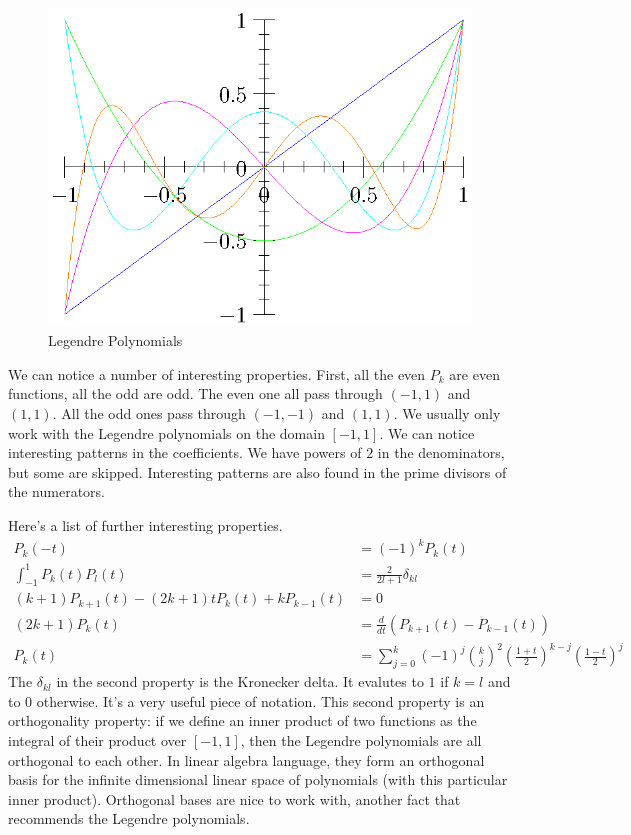 \documentclass[fleqn,letterpaper]{report}
\begin{document}
\begin{figure}[t]
\centering
\includegraphics[width=12cm]{figure20.eps}
\caption{Legendre Polynomials}
\label{figure-legendre-polynomials}
\end{figure}

We can notice a number of interesting properties. First, all
the even $P_k$ are even functions, all the odd are odd. The
even one all pass through $(-1,1)$ and $(1,1)$. All the odd
ones pass through $(-1,-1)$ and $(1,1)$. We usually only work
with the Legendre polynomials on the domain $[-1,1]$. We can
notice interesting patterns in the coefficients. We have
powers of $2$ in the denominators, but some are skipped. 
Interesting patterns are also found in the prime divisors of
the numerators.

Here's a list of further interesting properties.
\begin{align*}
P_k(-t) & = (-1)^k P_k(t) \\
\int_{-1}^1 P_k(t) P_l(t) & = \frac{2}{2l+1} \delta_{kl} \\
(k+1)P_{k+1}(t) - (2k+1)tP_k(t) + k P_{k-1}(t) & = 0 \\
(2k+1) P_k(t) & = \frac{d}{dt} \left( P_{k+1}(t) - P_{k-1}(t)
\right) \\
P_k(t) & = \sum_{j=0}^k (-1)^j \binom{k}{j}^2 \left(
\frac{1+t}{2} \right)^{k-j} \left( \frac{1-t}{2} \right)^j
\end{align*}
The $\delta_{kl}$ in the second property is the Kronecker
delta. It evalutes to $1$ if $k=l$ and to $0$ otherwise.
It's a very useful piece of notation. This second property is
an orthogonality property: if we define an inner product of
two functions as the integral of their product over $[-1,1]$,
then the Legendre polynomials are all orthogonal to each
other. In linear algebra language, they form an orthogonal
basis for the infinite dimensional linear space of polynomials
(with this particular inner product). Orthogonal bases are
nice to work with, another fact that recommends the
Legendre polynomials.
\end{document}
